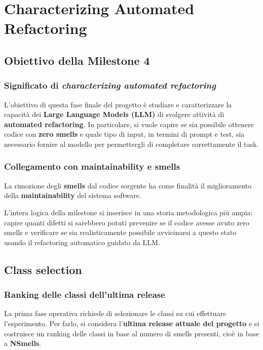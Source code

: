 \chapter{Characterizing Automated Refactoring}

\section{Obiettivo della Milestone 4}

\subsection{Significato di \emph{characterizing automated refactoring}}

L'obiettivo di questa fase finale del progetto è studiare e caratterizzare la capacità dei \textbf{Large Language Models (LLM)} di svolgere attività di \textbf{automated refactoring}. In particolare, si vuole capire se sia possibile ottenere codice con \textbf{zero smells} e quale tipo di input, in termini di prompt e test, sia necessario fornire al modello per permettergli di completare correttamente il task.

\subsection{Collegamento con maintainability e smells}

La rimozione degli \textbf{smells} dal codice sorgente ha come finalità il miglioramento della \textbf{maintainability} del sistema software.

\begin{notaesame}
L'intera logica della milestone si inserisce in una storia metodologica più ampia: capire quanti difetti si sarebbero potuti prevenire se il codice avesse avuto zero smells e verificare se sia realisticamente possibile avvicinarsi a questo stato usando il refactoring automatico guidato da LLM.
\end{notaesame}

\section{Class selection}

\subsection{Ranking delle classi dell'ultima release}

La prima fase operativa richiede di selezionare le classi su cui effettuare l'esperimento. Per farlo, si considera l'\textbf{ultima release attuale del progetto} e si costruisce un ranking delle classi in base al numero di smells presenti, cioè in base a \textbf{NSmells}.

